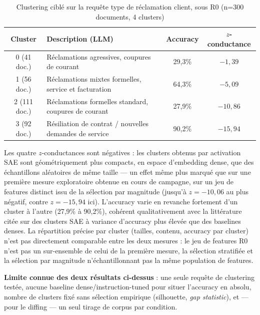 \documentclass[11pt]{article}
\begin{document}
\begin{table}[h!]
\centering
\caption{Clustering ciblé sur la requête \og{}type de réclamation client\fg{}, sous R0 (n=300 documents, 4 clusters)}
\label{tab:clustering}
\vspace{0.4em}\small
\begin{tabular}{@{}clcc@{}}
\toprule
\textbf{Cluster} & \textbf{Description (LLM)} & \textbf{Accuracy} & \textbf{$z$-conductance} \\ \midrule
0 (41 doc.) & Réclamations agressives, coupures de courant & 29,3\% & $-1{,}39$ \\
1 (56 doc.) & Réclamations mixtes formelles, service et facturation & 64,3\% & $-5{,}09$ \\
2 (111 doc.) & Réclamations formelles standard, coupures de courant & 27,9\% & $-10{,}86$ \\
3 (92 doc.) & Résiliation de contrat / nouvelles demandes de service & 90,2\% & $-15{,}94$ \\
\bottomrule
\end{tabular}
\end{table}

Les quatre $z$-conductances sont négatives : les clusters obtenus par
activation SAE sont géométriquement plus compacts, en espace d'embedding
dense, que des échantillons aléatoires de même taille --- un effet même plus
marqué que sur une première mesure exploratoire obtenue en cours de
campagne, sur un jeu de features distinct issu de la sélection par magnitude
(jusqu'à $z=-10{,}06$ au plus négatif, contre $z=-15{,}94$ ici). L'accuracy
varie en revanche fortement d'un cluster à l'autre (27,9\% à 90,2\%),
cohérent qualitativement avec la littérature citée sur des clusters SAE à
variance d'accuracy plus élevée que des baselines denses. La répartition
précise par cluster (tailles, contenu, accuracy par cluster) n'est pas
directement comparable entre les deux mesures : le jeu de features R0 n'est
pas un sur-ensemble de celui de la première mesure, la sélection stratifiée
et la sélection par magnitude n'échantillonnant pas la même population de
features.

\textbf{Limite connue des deux résultats ci-dessus} : une seule requête de
clustering testée, aucune baseline dense/instruction-tuned pour situer
l'accuracy en absolu, nombre de clusters fixé sans sélection empirique
(silhouette, \emph{gap statistic}), et --- pour le diffing --- un seul
tirage de corpus par condition.
\end{document}
